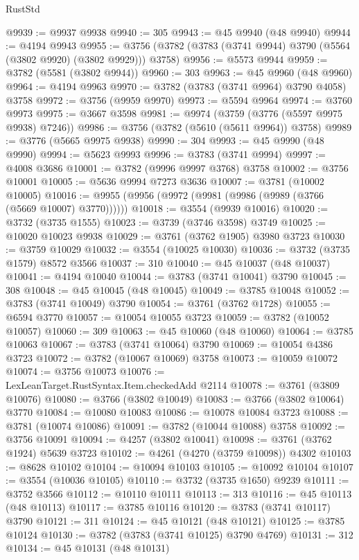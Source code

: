 \begin{lexlean}{RustStd}
\begin{coremodule}
@9939 := @9937 @9938
@9940 := 305
@9943 := @45 @9940 (@48 @9940)
@9944 := @4194 @9943
@9955 := @3756 (@3782 (@3783 (@3741 @9944) @3790 (@5564 (@3802 @9920) (@3802 @9929))) @3758)
@9956 := @5573 @9944
@9959 := @3782 (@5581 (@3802 @9944))
@9960 := 303
@9963 := @45 @9960 (@48 @9960)
@9964 := @4194 @9963
@9970 := @3782 (@3783 (@3741 @9964) @3790 @4058) @3758
@9972 := @3756 (@9959 @9970)
@9973 := @5594 @9964
@9974 := @3760 @9973
@9975 := @3667 @3598
@9981 := @9974 (@3759 (@3776 (@5597 @9975 @9938) @7246))
@9986 := @3756 (@3782 (@5610 (@5611 @9964)) @3758)
@9989 := @3776 (@5665 @9975 @9938)
@9990 := 304
@9993 := @45 @9990 (@48 @9990)
@9994 := @5623 @9993
@9996 := @3783 (@3741 @9994)
@9997 := @4008 @3686
@10001 := @3782 (@9996 @9997 @3768) @3758
@10002 := @3756 @10001
@10005 := @5636 @9994 @7273 @3636
@10007 := @3781 (@10002 @10005)
@10016 := @9955 (@9956 (@9972 (@9981 (@9986 (@9989 (@3766 (@5669 @10007) @3770))))))
@10018 := @3554 (@9939 @10016)
@10020 := @3732 (@3735 @1555)
@10023 := @3739 (@3746 @3598) @3749
@10025 := @10020 @10023 @9938
@10029 := @3761 (@3762 @1905) @3980 @3723
@10030 := @3759 @10029
@10032 := @3554 (@10025 @10030)
@10036 := @3732 (@3735 @1579) @8572 @3566
@10037 := 310
@10040 := @45 @10037 (@48 @10037)
@10041 := @4194 @10040
@10044 := @3783 (@3741 @10041) @3790
@10045 := 308
@10048 := @45 @10045 (@48 @10045)
@10049 := @3785 @10048
@10052 := @3783 (@3741 @10049) @3790
@10054 := @3761 (@3762 @1728)
@10055 := @6594 @3770
@10057 := @10054 @10055 @3723
@10059 := @3782 (@10052 @10057)
@10060 := 309
@10063 := @45 @10060 (@48 @10060)
@10064 := @3785 @10063
@10067 := @3783 (@3741 @10064) @3790
@10069 := @10054 @4386 @3723
@10072 := @3782 (@10067 @10069) @3758
@10073 := @10059 @10072
@10074 := @3756 @10073
@10076 := LexLeanTarget.RustSyntax.Item.checkedAdd @2114
@10078 := @3761 (@3809 @10076)
@10080 := @3766 (@3802 @10049)
@10083 := @3766 (@3802 @10064) @3770
@10084 := @10080 @10083
@10086 := @10078 @10084 @3723
@10088 := @3781 (@10074 @10086)
@10091 := @3782 (@10044 @10088) @3758
@10092 := @3756 @10091
@10094 := @4257 (@3802 @10041)
@10098 := @3761 (@3762 @1924) @5639 @3723
@10102 := @4261 (@4270 (@3759 @10098)) @4302
@10103 := @8628 @10102
@10104 := @10094 @10103
@10105 := @10092 @10104
@10107 := @3554 (@10036 @10105)
@10110 := @3732 (@3735 @1650) @9239
@10111 := @3752 @3566
@10112 := @10110 @10111
@10113 := 313
@10116 := @45 @10113 (@48 @10113)
@10117 := @3785 @10116
@10120 := @3783 (@3741 @10117) @3790
@10121 := 311
@10124 := @45 @10121 (@48 @10121)
@10125 := @3785 @10124
@10130 := @3782 (@3783 (@3741 @10125) @3790 @4769)
@10131 := 312
@10134 := @45 @10131 (@48 @10131)

\end{coremodule}
\end{lexlean}
